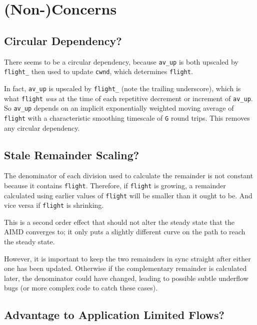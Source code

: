 \section{(Non-)Concerns}\label{prresp_Non-Concerns}

\subsection{Circular Dependency?}\label{prresp_No_Circular_Dependency}

There seems to be a circular dependency, because \texttt{av\_up} is both
upscaled by \texttt{flight\_} then used to update \texttt{cwnd}, which
determines \texttt{flight}.

In fact, \texttt{av\_up} is upscaled by \texttt{flight\_} (note the trailing
underscore), which is what \texttt{flight} \emph{was} at the time of each
repetitive decrement or increment of \texttt{av\_up}. So \texttt{av\_up} depends
on an implicit exponentially weighted moving average of \texttt{flight} with a
characteristic smoothing timescale of \texttt{G} round trips. This removes any
circular dependency.

\subsection{Stale Remainder Scaling?}\label{prresp_Stale_Remainder_Scale}

The denominator of each division used to calculate the remainder is not constant
because it contains \texttt{flight}. Therefore, if \texttt{flight} is growing, a
remainder calculated using earlier values of \texttt{flight} will be smaller
than it ought to be. And vice versa if \texttt{flight} is shrinking. 

This is a second order effect that should not alter the steady state that the
AIMD converges to; it only puts a slightly different curve on the path to reach
the steady state. 

However, it is important to keep the two remainders in sync straight after
either one has been updated. Otherwise if the complementary remainder is
calculated later, the denominator could have changed, leading to possible subtle
underflow bugs (or more complex code to catch these cases).

\subsection{Advantage to Application Limited
	Flows?}\label{prresp_Advantage_App-Limited}

